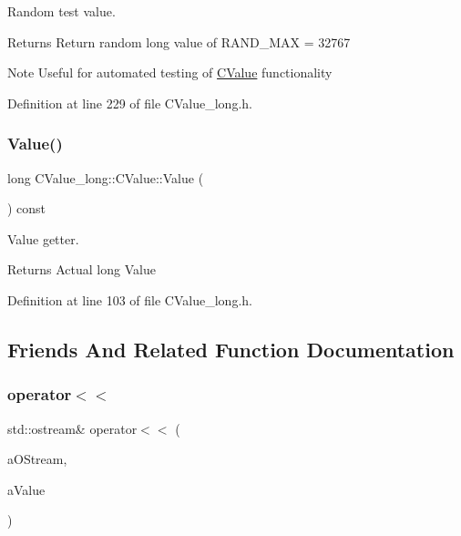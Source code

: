 Random test value. 

\begin{DoxyReturn}{Returns}
Return random {\ttfamily long} value of R\+A\+N\+D\+\_\+\+M\+AX = 32767 
\end{DoxyReturn}
\begin{DoxyNote}{Note}
Useful for automated testing of \hyperlink{class_c_value__long_1_1_c_value}{C\+Value} functionality 
\end{DoxyNote}


Definition at line 229 of file C\+Value\+\_\+long.\+h.

\mbox{\label{class_c_value__long_1_1_c_value_acd5b8c8a9c9c6c3d152a2fef95a8ecb1}} 
\subsubsection{\texorpdfstring{Value()}{Value()}}
{\footnotesize\ttfamily long C\+Value\+\_\+long\+::\+C\+Value\+::\+Value (\begin{DoxyParamCaption}{ }\end{DoxyParamCaption}) const\hspace{0.3cm}{\ttfamily [inline]}}



Value getter. 

\begin{DoxyReturn}{Returns}
Actual {\ttfamily long} {\ttfamily Value} 
\end{DoxyReturn}


Definition at line 103 of file C\+Value\+\_\+long.\+h.



\subsection{Friends And Related Function Documentation}
\mbox{\label{class_c_value__long_1_1_c_value_a3d28097fae6bdd5a8146d9ab90f8b62f}} 
\subsubsection{\texorpdfstring{operator$<$$<$}{operator<<}}
{\footnotesize\ttfamily std\+::ostream\& operator$<$$<$ (\begin{DoxyParamCaption}\item[{std\+::ostream \&}]{a\+O\+Stream,  }\item[{const \hyperlink{class_c_value__long_1_1_c_value}{C\+Value} \&}]{a\+Value }\end{DoxyParamCaption})\hspace{0.3cm}{\ttfamily [friend]}}



